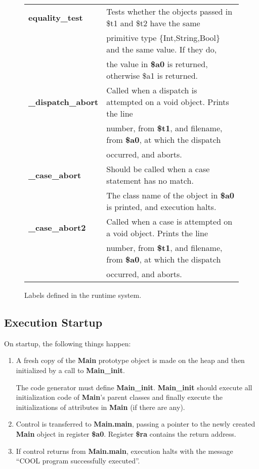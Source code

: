 \documentclass[11pt]{article}
\def\C#1{{\bf{}#1}}
\begin{document}
\begin{figure}
\begin{center}
\begin{tabular}{|l|l|}
\hline
\C{equality\_test}	& Tests whether the objects passed in \$t1 and \$t2
have the same\\
		& primitive type \{Int,String,Bool\} and the same
value. If they do,\\
		& the value in \C{\$a0} is returned, otherwise \$a1 is
returned.\\
\C{\_dispatch\_abort}	& Called when a dispatch is attempted on a void object.
Prints the line \\
               & number, from  \C{\$t1}, and filename, from \C{\$a0}, at
which the dispatch \\
               & occurred, and aborts.\\
\C{\_case\_abort}	& Should be called when a case statement has no match. \\
		& The class name of the object in \C{\$a0} is printed, and
execution halts.\\
\C{\_case\_abort2}       & Called when a case is attempted on a void object.
Prints the line \\
               & number, from  \C{\$t1}, and filename, from \C{\$a0}, at
which the dispatch \\
               & occurred, and aborts.\\
\hline
\end{tabular}
\end{center}
\caption{Labels defined in the runtime system.}
\label{fig2}
\end{figure}

\subsection{Execution Startup}
On startup, the following things happen:
\begin{enumerate}
\item
   A fresh copy of the \C{Main} prototype object is made on the heap and
   then initialized by a call to \C{Main\_init}.

   The code generator must define \C{Main\_init}.  \C{Main\_init}
should execute all initialization code of \C{Main}'s parent classes
and finally execute the initializations of attributes in \C{Main} (if
there are any). 

\item
   Control is transferred to \C{Main.main}, passing a pointer to the newly
   created \C{Main} object in  register \C{\$a0}. Register \C{\$ra} contains the
   return address.

\item
   If control returns from \C{Main.main}, execution halts with the message
``COOL program successfully executed''.
\end{enumerate}
\end{document}
